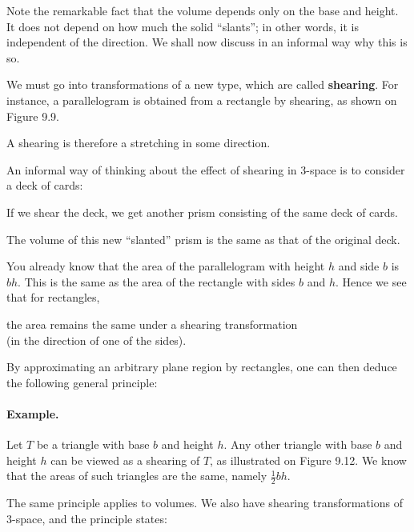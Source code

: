 \documentclass[12pt]{book} %
\begin{document}
Note the remarkable fact that the volume depends only on the base and height. It does not depend on how much the solid ``slants''; in other words, it is independent of the direction. We shall now discuss in an informal way why this is so.

We must go into transformations of a new type, which are called \textbf{shearing}. For instance, a parallelogram is obtained from a rectangle by shearing, as shown on Figure 9.9.


A shearing is therefore a stretching in some direction.

An informal way of thinking about the effect of shearing in 3-space is to consider a deck of cards:


If we shear the deck, we get another prism consisting of the same deck of cards.


The volume of this new ``slanted'' prism is the same as that of the original deck.

You already know that the area of the parallelogram with height $h$ and side $b$ is $bh$. This is the same as the area of the rectangle with sides $b$ and $h$. Hence we see that for rectangles,

\begin{center}
the area remains the same under a shearing transformation\\
(in the direction of one of the sides).
\end{center}

By approximating an arbitrary plane region by rectangles, one can then deduce the following general principle:


\paragraph{Example.}
Let $T$ be a triangle with base $b$ and height $h$. Any other triangle with base $b$ and height $h$ can be viewed as a shearing of $T$, as illustrated on Figure 9.12. We know that the areas of such triangles are the same, namely $\frac12 bh$.


The same principle applies to volumes. We also have shearing transformations of 3-space, and the principle states:
\end{document}
